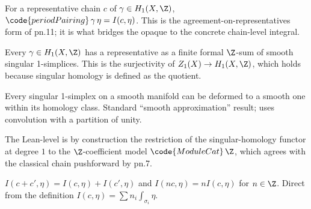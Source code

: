 \begin{lemma}
\label{lem:pn-r12}
For a representative chain $c$ of $\gamma\in H_{1}(X,\Z)$,
$\code{periodPairing}\,\gamma\,\eta=I(c,\eta)$.  This is the
agreement-on-representatives form of pn.11; it is what bridges the
opaque  to the concrete chain-level integral.
\leanok
\end{lemma}

\begin{lemma}
\label{lem:pn-r13}
Every $\gamma\in H_{1}(X,\Z)$ has a representative as a finite formal
$\Z$-sum of smooth singular 1-simplices.  This is the surjectivity of
$Z_{1}(X)\to H_{1}(X,\Z)$, which holds because singular
homology is defined as the quotient.
\leanok
\end{lemma}

\begin{lemma}
\label{lem:pn-r14}
Every singular 1-simplex on a smooth manifold can be deformed to a
smooth one within its homology class.  Standard ``smooth approximation''
result; uses convolution with a partition of unity.
\leanok
\end{lemma}

\begin{lemma}
\label{lem:pn-r15}
The Lean-level  is by construction the
restriction of the singular-homology functor at degree $1$ to the
$\Z$-coefficient model $\code{ModuleCat}\,\Z$, which agrees with the
classical chain pushforward by pn.7.
\leanok
\end{lemma}

\begin{lemma}
\label{lem:pn-r16}
$I(c+c',\eta)=I(c,\eta)+I(c',\eta)$ and $I(nc,\eta)=nI(c,\eta)$ for
$n\in\Z$.  Direct from the definition $I(c,\eta)=\sum n_{i}\int_{\sigma_{i}}\eta$.
\leanok
\end{lemma}

